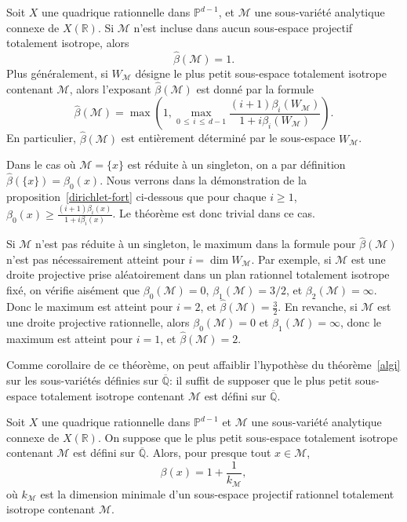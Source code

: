 \documentclass[AHL,Unicode,longabstracts,francais,published]{cedram}
\newcommand{\R}{\mathbb{R}}
\newcommand{\PP}{\mathbb{P}}
\newcommand{\QQ}{\overline{\mathbb{Q}}}
\newcommand{\cM}{\mathcal{M}}
\newcommand{\bbeta}{\widehat{\beta}}
\begin{document}
\begin{theo}\label{formexpi}
Soit $X$ une quadrique rationnelle dans $\PP^{d-1}$, et $\cM$ une sous-variété analytique connexe de $X(\R)$. Si $\cM$ n'est incluse dans aucun sous-espace projectif totalement isotrope, alors
\[
\bbeta(\cM) = 1.
\]
Plus généralement, si $W_{\cM}$ désigne le plus petit sous-espace totalement isotrope contenant $\cM$, alors l'exposant $\bbeta(\cM)$ est donné par la formule
\[
\bbeta(\cM) = \max\left(1,\max_{0\,\leq\,i\,\leq\, d-1} \frac{(i+1)\beta_i(W_{\cM})}{1+i\beta_i(W_{\cM})}\right).
\]
En particulier, $\bbeta(\cM)$ est entièrement déterminé par le sous-espace $W_{\cM}$.
\end{theo}

\begin{exem}
Dans le cas où $\cM=\{x\}$ est réduite à un singleton, on a par définition $\bbeta(\{x\})=\beta_0(x)$. Nous verrons dans la démonstration de la proposition~\ref{dirichlet-fort} ci-dessous que pour chaque $i\geq 1$, $\beta_0(x) \geq \frac{(i+1)\beta_i(x)}{1+i\beta_i(x)}$. Le théorème est donc trivial dans ce cas.
\end{exem}

\begin{exem}
Si $\cM$ n'est pas réduite à un singleton, le maximum dans la formule pour $\bbeta(\cM)$ n'est pas nécessairement atteint pour $i=\dim W_{\cM}$. Par exemple, si $\cM$ est une droite projective prise aléatoirement dans un plan rationnel totalement isotrope fixé, on vérifie aisément que $\beta_0(\cM)=0$, $\beta_1(\cM)=3/2$, et $\beta_2(\cM)=\infty$. Donc le maximum est atteint pour $i=2$, et $\bbeta(\cM)=\frac{3}{2}$. En revanche, si $\cM$ est une droite projective rationnelle, alors $\beta_0(\cM)=0$ et $\beta_1(\cM)=\infty$, donc le maximum est atteint pour $i=1$, et $\bbeta(\cM)=2$.
\end{exem}

Comme corollaire de ce théorème, on peut affaiblir l'hypothèse du théorème~\ref{algi} sur les sous-variétés définies sur $\QQ$: il suffit de supposer que le plus petit sous-espace totalement isotrope contenant $\cM$ est défini sur $\QQ$.

\begin{coro}\label{petitplus}
Soit $X$ une quadrique rationnelle dans $\PP^{d-1}$ et $\cM$ une sous-variété analytique connexe de $X(\R)$. On suppose que le plus petit sous-espace totalement isotrope contenant $\cM$ est défini sur $\QQ$. Alors, pour presque tout $x\in\cM$,
\[
\beta(x) = 1 + \frac{1}{k_{\cM}},
\]
où $k_{\cM}$ est la dimension minimale d'un sous-espace projectif rationnel totalement isotrope contenant $\cM$.
\end{coro}
\end{document}
